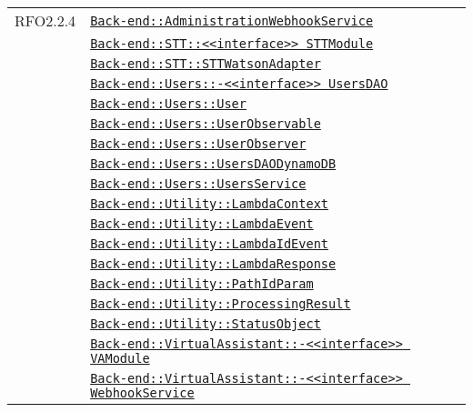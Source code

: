 \begin{longtable}{|>{\centering}m{3cm}|m{10cm}<{\centering}|}
RFO2.2.4 & \hyperref[Back-end::AdministrationWebhookService]{\texttt{Back-end::AdministrationWebhookService}}\\
& \hyperref[Back-end::STT::<<interface>> STTModule]{\texttt{Back-end::STT::<<interface>> STTModule}}\\
& \hyperref[Back-end::STT::STTWatsonAdapter]{\texttt{Back-end::STT::STTWatsonAdapter}}\\
& \hyperref[Back-end::Users::<<interface>> UsersDAO]{\texttt{Back-end::Users::-\linebreak <<interface>> UsersDAO}}\\
& \hyperref[Back-end::Users::User]{\texttt{Back-end::Users::User}}\\
& \hyperref[Back-end::Users::UserObservable]{\texttt{Back-end::Users::UserObservable}}\\
& \hyperref[Back-end::Users::UserObserver]{\texttt{Back-end::Users::UserObserver}}\\
& \hyperref[Back-end::Users::UsersDAODynamoDB]{\texttt{Back-end::Users::UsersDAODynamoDB}}\\
& \hyperref[Back-end::Users::UsersService]{\texttt{Back-end::Users::UsersService}}\\
& \hyperref[Back-end::Utility::LambdaContext]{\texttt{Back-end::Utility::LambdaContext}}\\
& \hyperref[Back-end::Utility::LambdaEvent]{\texttt{Back-end::Utility::LambdaEvent}}\\
& \hyperref[Back-end::Utility::LambdaIdEvent]{\texttt{Back-end::Utility::LambdaIdEvent}}\\
& \hyperref[Back-end::Utility::LambdaResponse]{\texttt{Back-end::Utility::LambdaResponse}}\\
& \hyperref[Back-end::Utility::PathIdParam]{\texttt{Back-end::Utility::PathIdParam}}\\
& \hyperref[Back-end::Utility::ProcessingResult]{\texttt{Back-end::Utility::ProcessingResult}}\\
& \hyperref[Back-end::Utility::StatusObject]{\texttt{Back-end::Utility::StatusObject}}\\
& \hyperref[Back-end::VirtualAssistant::<<interface>> VAModule]{\texttt{Back-end::VirtualAssistant::-\linebreak <<interface>> VAModule}}\\
& \hyperref[Back-end::VirtualAssistant::<<interface>> WebhookService]{\texttt{Back-end::VirtualAssistant::-\linebreak <<interface>> WebhookService}}\\

\end{longtable}
